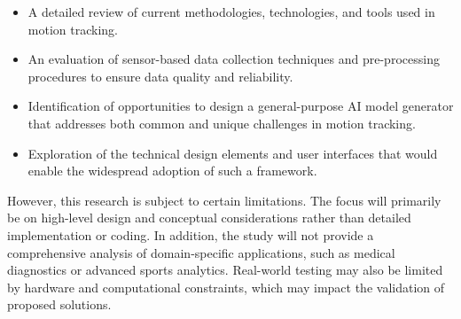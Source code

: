 \begin{itemize}
\item A detailed review of current methodologies, technologies, and tools used in motion tracking.

\item An evaluation of sensor-based data collection techniques and pre-processing procedures to ensure data quality and reliability.

\item Identification of opportunities to design a general-purpose AI model generator that addresses both common and unique challenges in motion tracking.

\item Exploration of the technical design elements and user interfaces that would enable the widespread adoption of such a framework.

\end{itemize}

However, this research is subject to certain limitations. The focus will primarily be on high-level design and conceptual considerations rather than detailed implementation or coding. In addition, the study will not provide a comprehensive analysis of domain-specific applications, such as medical diagnostics or advanced sports analytics. Real-world testing may also be limited by hardware and computational constraints, which may impact the validation of proposed solutions.